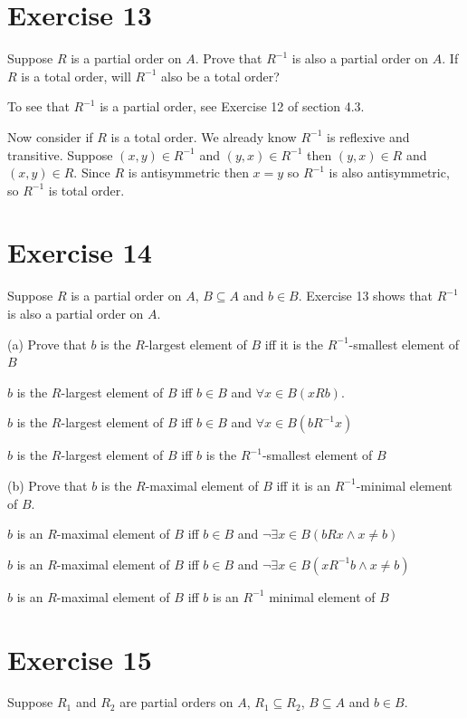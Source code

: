 \documentclass[11pt]{article}
\begin{document}
\section*{Exercise 13}

Suppose $R$ is a partial order on $A$. Prove that $R^{-1}$ is also a partial 
order on $A$. If $R$ is a total order, will $R^{-1}$ also be a total order?

To see that $R^{-1}$ is a partial order, see Exercise 12 of section 4.3.

Now consider if $R$ is a total order. We already know $R^{-1}$ is reflexive
and transitive. Suppose $(x,y) \in R^{-1}$ and $(y,x) \in R^{-1}$ then 
$(y,x) \in R$ and $(x,y) \in R$. Since $R$ is antisymmetric then 
$x=y$ so $R^{-1}$ is also antisymmetric, so $R^{-1}$ is total order.

\section*{Exercise 14}

Suppose $R$ is a partial order on $A$, $B \subseteq A$ and $b \in B$. Exercise 
13 shows that $R^{-1}$ is also a partial order on $A$.

\noindent (a) Prove that $b$ is the $R$-largest element of $B$ iff it is the 
$R^{-1}$-smallest element of $B$

$b$ is the $R$-largest element of $B$ iff $b \in B$ and $\forall x \in B (xRb)$.

$b$ is the $R$-largest element of $B$ iff $b \in B$ and $\forall x \in B (bR^{-1} x)$

$b$ is the $R$-largest element of $B$ iff $b$ is the $R^{-1}$-smallest element of $B$

\noindent (b) Prove that $b$ is the $R$-maximal element of $B$ iff it is an 
$R^{-1}$-minimal element of $B$.

$b$ is an $R$-maximal element of $B$ iff $b \in B$ and $\neg \exists x \in B (bRx \wedge x \neq b)$

$b$ is an $R$-maximal element of $B$ iff $b \in B$ and $\neg \exists x \in B (xR^{-1}b \wedge x \neq b)$

$b$ is an $R$-maximal element of $B$ iff $b$ is an $R^{-1}$ minimal element of $B$

\section*{Exercise 15}

Suppose $R_1$ and $R_2$ are partial orders on $A$, $R_1 \subseteq R_2$, 
$B \subseteq A$ and $b \in B$.
\end{document}
